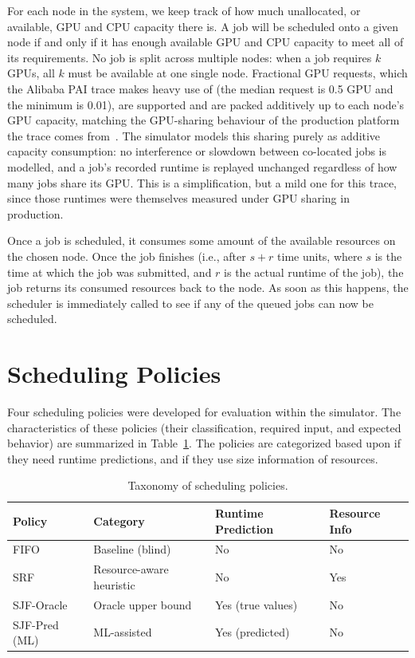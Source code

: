 For each node in the system, we keep track of how much unallocated, or available, GPU and CPU capacity there is. A job will be scheduled onto a given node if and only if it has enough available GPU and CPU capacity to meet all of its requirements. No job is split across multiple nodes: when a job requires $k$ GPUs, all $k$ must be available at one single node. Fractional GPU requests, which the Alibaba PAI trace makes heavy use of (the median request is 0.5 GPU and the minimum is 0.01), are supported and are packed additively up to each node's GPU capacity, matching the GPU-sharing behaviour of the production platform the trace comes from~\cite{weng2022mlaas}. The simulator models this sharing purely as additive capacity consumption: no interference or slowdown between co-located jobs is modelled, and a job's recorded runtime is replayed unchanged regardless of how many jobs share its GPU. This is a simplification, but a mild one for this trace, since those runtimes were themselves measured under GPU sharing in production.

Once a job is scheduled, it consumes some amount of the available resources on the chosen node. Once the job finishes (i.e., after $s + r$ time units, where $s$ is the time at which the job was submitted, and $r$ is the actual runtime of the job), the job returns its consumed resources back to the node. As soon as this happens, the scheduler is immediately called to see if any of the queued jobs can now be scheduled.

\section{Scheduling Policies}
\label{sec:policies}

Four scheduling policies were developed for evaluation within the simulator. The characteristics of these policies (their classification, required input, and expected behavior) are summarized in Table~\ref{tab:policies}. The policies are categorized based upon if they need runtime predictions, and if they use size information of resources.

\begin{table}[H]
\centering
\caption[Taxonomy of scheduling policies]{Taxonomy of scheduling policies.}
\label{tab:policies}
\begin{tabular}{llll}
\hline
\textbf{Policy} & \textbf{Category} & \textbf{Runtime Prediction} & \textbf{Resource Info} \\
\hline
FIFO          & Baseline (blind)   & No  & No \\ 
SRF           & Resource-aware heuristic & No  & Yes \\ 
SJF-Oracle    & Oracle upper bound  & Yes (true values) & No \\ 
SJF-Pred (ML) & ML-assisted        & Yes (predicted)   & No \\ 
\hline
\end{tabular}
\end{table}

